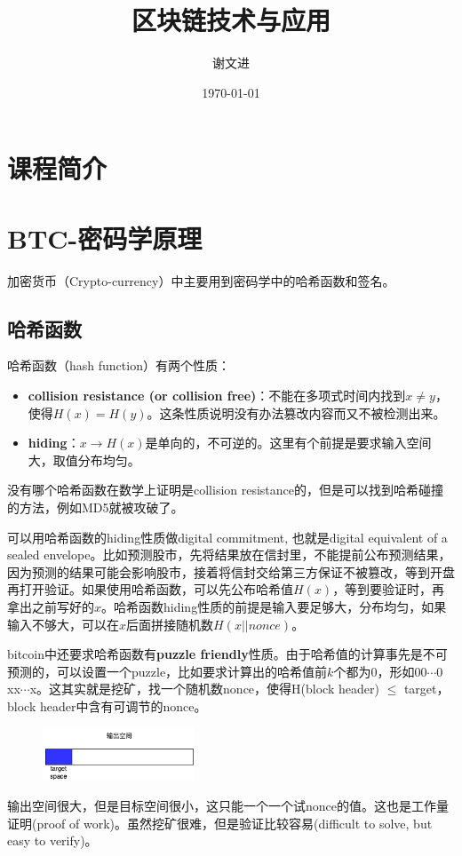 \documentclass[10pt]{ctexart}
\title{区块链技术与应用}
\author{谢文进}
\date{\today}
\begin{document}
\maketitle
\tableofcontents

\section{课程简介}
 
\section{BTC-密码学原理}
加密货币（Crypto-currency）中主要用到密码学中的哈希函数和签名。
\subsection{哈希函数}
哈希函数（hash function）有两个性质：
\begin{itemize}
    \item \textbf{collision resistance (or collision free)}：不能在多项式时间内找到$x \neq y$，使得$H(x)=H(y)$。这条性质说明没有办法篡改内容而又不被检测出来。
    \item \textbf{hiding}：$x \rightarrow H(x)$是单向的，不可逆的。这里有个前提是要求输入空间大，取值分布均匀。
\end{itemize}
没有哪个哈希函数在数学上证明是collision resistance的，但是可以找到哈希碰撞的方法，例如MD5就被攻破了。

可以用哈希函数的hiding性质做digital commitment, 也就是digital equivalent of a sealed envelope。比如预测股市，先将结果放在信封里，不能提前公布预测结果，因为预测的结果可能会影响股市，接着将信封交给第三方保证不被篡改，等到开盘再打开验证。如果使用哈希函数，可以先公布哈希值$H(x)$，等到要验证时，再拿出之前写好的$x$。哈希函数hiding性质的前提是输入要足够大，分布均匀，如果输入不够大，可以在$x$后面拼接随机数$H(x||nonce)$。

bitcoin中还要求哈希函数有\textbf{puzzle friendly}性质。由于哈希值的计算事先是不可预测的，可以设置一个puzzle，比如要求计算出的哈希值前$k$个都为0，形如$00\cdots 0 $xx$\cdots$x。这其实就是挖矿，找一个随机数nonce，使得H(block header) $\le$ target，block header中含有可调节的nonce。
\begin{figure}[H]
    \centering
    \includegraphics[width=0.4\textwidth]{./lecture2/lecture1-1.png} 
\end{figure}
输出空间很大，但是目标空间很小，这只能一个一个试nonce的值。这也是工作量证明(proof of work)。虽然挖矿很难，但是验证比较容易(difficult to solve, but easy to verify)。
\end{document}
